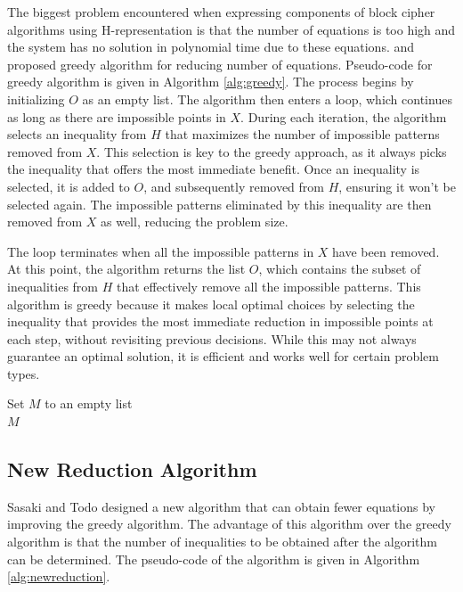 The biggest problem encountered when expressing components of block cipher algorithms using H-representation is that the number of equations is too high and the system has no solution in polynomial time due to these equations. \cite{sun2014automatic} and \cite{sun2014towards} proposed greedy algorithm for reducing number of equations. Pseudo-code for greedy algorithm is given in Algorithm \ref{alg:greedy}. The process begins by initializing $O$ as an empty list. The algorithm then enters a loop, which continues as long as there are impossible points in $X$. During each iteration, the algorithm selects an inequality from $H$ that maximizes the number of impossible patterns removed from $X$. This selection is key to the greedy approach, as it always picks the inequality that offers the most immediate benefit. Once an inequality is selected, it is added to $O$, and subsequently removed from $H$, ensuring it won’t be selected again. The impossible patterns eliminated by this inequality are then removed from $X$ as well, reducing the problem size.

The loop terminates when all the impossible patterns in $X$ have been removed. At this point, the algorithm returns the list $O$, which contains the subset of inequalities from $H$ that effectively remove all the impossible patterns. This algorithm is greedy because it makes local optimal choices by selecting the inequality that provides the most immediate reduction in impossible points at each step, without revisiting previous decisions. While this may not always guarantee an optimal solution, it is efficient and works well for certain problem types.

\begin{algorithm}[H]
    \DontPrintSemicolon
    \caption{Pseudo-code for Greedy Algorithm }
    \label{alg:greedy}
    Set $M$ to an empty list \\
    \Return $M$
\end{algorithm}

\subsection{New Reduction Algorithm}
Sasaki and Todo designed a new algorithm \cite{sasaki2017new1} that can obtain fewer equations by improving the greedy algorithm. The advantage of this algorithm over the greedy algorithm is that the number of inequalities to be obtained after the algorithm can be determined. The pseudo-code of the algorithm is given in Algorithm \ref{alg:newreduction}.

